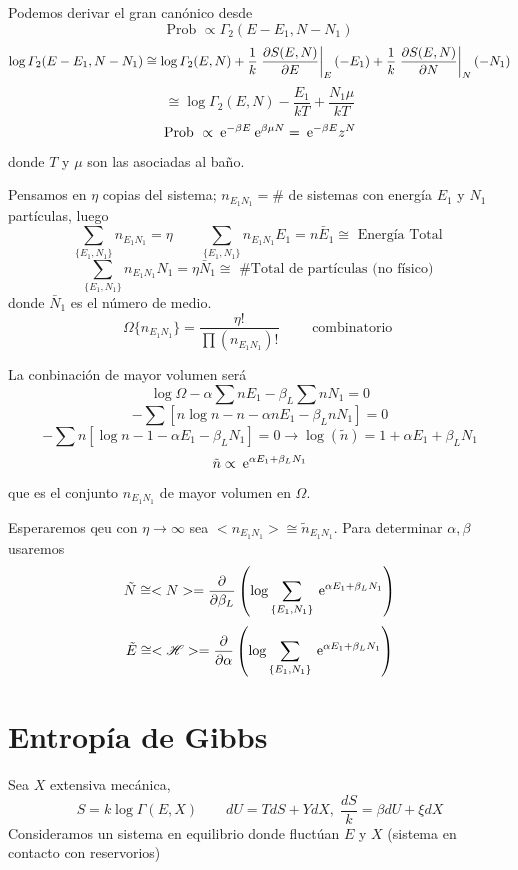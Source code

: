 \documentclass[10pt,oneside]{CBFT_book}
\begin{document}
Podemos derivar el gran canónico desde 
\[
	\text{Prob } \propto \Gamma_2(E-E_1, N-N_1)
\]
\[
	\log  \Gamma_2(E-E_1, N-N_1) \cong  \log \Gamma_2( E, N ) + \frac{1}{k} \left. \frac{\partial^{\hspace{-0.05em}} {S(E,N)}}{\partial {E}^{\hspace{-0.05em}}} \right|_E(-E_1)
	+\frac{1}{k} \left. \frac{\partial^{\hspace{-0.05em}} {S(E,N)}}{\partial {N}^{\hspace{-0.05em}}} \right|_N(-N_1)
\]
\[
	\cong \log \Gamma_2( E, N ) - \frac{E_1}{kT} + \frac{N_1\mu}{kT}
\]
\[
	\text{Prob } \propto \:\mathrm{e}^{-\beta E}  \:\mathrm{e}^{\beta \mu N}  = \:\mathrm{e}^{-\beta E} z^N
\]
donde $T$ y $\mu$ son las asociadas al baño.

Pensamos en $\eta$ copias del sistema; $n_{E_1N_1} = \# $ de sistemas con energía $E_1$ y $N_1$ partículas,
luego 
\[
	\sum_{\{ E_1, N_1 \}} n_{E_1N_1} = \eta \qquad \sum_{\{ E_1, N_1 \}} n_{E_1N_1}E_1 = n\bar{E}_1 \cong 
	\text{ Energía Total }
\]
\[
	\sum_{\{ E_1, N_1 \}} n_{E_1N_1} N_1 = \eta \bar{N}_1 \cong \text{ \# Total de partículas (no físico) }
\]
donde $ \bar{N}_1 $ es el número de medio.
\[
	\Omega\{ n_{E_1N_1} \} = \frac{\eta !}{\prod (n_{E_1N_1})!} \qquad \text{ combinatorio }
\]

La conbinación de mayor volumen será 
\[
	\log \Omega - \alpha \sum n E_1 - \beta_L \sum n N_1 = 0
\]
\[
	-\sum \left[ n\log n - n - \alpha n E_1 - \beta_L n N_1 \right] = 0
\]
\[
	-\sum n \left[ \log n - 1 - \alpha E_1 - \beta_L N_1 \right] = 0 
	\rightarrow \log(\tilde{n}) = 1 + \alpha E_1 + \beta_L N_1
\]
\[
	\tilde{n} \propto \:\mathrm{e}^{\alpha E_1 + \beta_L N_1}
\]
que es el conjunto $n_{E_1N_1}$ de mayor volumen en $ \Omega $.

Esperaremos qeu con $ \eta\to\infty $ sea $<n_{E_1N_1}> \cong \tilde{n}_{E_1N_1} $.
Para determinar $\alpha, \beta$ usaremos 
\[
	\tilde{N} \cong <N> = \frac{\partial^{\hspace{-0.05em}} {}}{\partial {\beta_L}^{\hspace{-0.05em}}}\left( \log \sum_{\{ E_1, N_1 \}} 
	\:\mathrm{e}^{\alpha E_1 + \beta_L N_1} \right)
\]
\[
	\tilde{E} \cong <\mathscr{H}> =  \frac{\partial^{\hspace{-0.05em}} {}}{\partial {\alpha}^{\hspace{-0.05em}}}\left( \log \sum_{\{ E_1, N_1 \}}
	\:\mathrm{e}^{\alpha E_1 + \beta_L N_1} \right)
\]

\section{Entropía de Gibbs}

Sea $X$ extensiva mecánica,
\[
	S = k \log \Gamma (E,X) \qquad dU = TdS + Y dX, \; \frac{dS}{k} = \beta dU + \xi dX
\]
Consideramos un sistema en equilibrio donde fluctúan $E$ y $X$ (sistema en contacto con reservorios)
\end{document}
